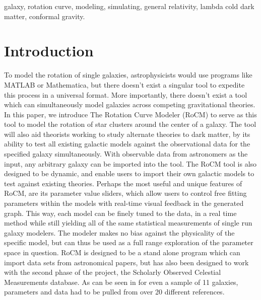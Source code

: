 \documentclass[conference]{IEEEtran-modified}
\begin{document}
	
	\begin{IEEEkeywords}
	\begin{center}
	galaxy, rotation curve, modeling, simulating, general relativity, lambda cold dark matter, conformal gravity.
	\end{center}	
	\end{IEEEkeywords}
	
	
	\IEEEpeerreviewmaketitle
\thispagestyle{plain}
\pagestyle{plain}

\section{Introduction}
To model the rotation of single galaxies, astrophysicists would use programs like MATLAB or Mathematica, but there doesn't exist a singular tool to expedite this process in a universal format.   More importantly, there doesn't exist a tool which can simultaneously model galaxies across competing gravitational theories.  In this paper, we introduce The Rotation Curve Modeler (RoCM) to serve as this tool to model the rotation of star clusters around the center of a galaxy. The tool will also aid theorists working to study alternate theories to dark matter, by its ability to test all existing galactic models against the observational data for the specified galaxy simultaneously. With observable data from astronomers as the input, any arbitrary galaxy can be imported into the tool. The RoCM tool is also designed to be dynamic, and enable users to import their own galactic models to test against existing theories.  Perhaps the most useful and unique features of RoCM, are its parameter value sliders, which allow users to control free fitting parameters within the models with real-time visual feedback in the generated graph. This way, each model can be finely tuned to the data, in a real time method while still yielding all of the same statistical measurements of single run galaxy modelers. The modeler makes no bias against the physicality of the specific model, but can thus be used as a full range exploration of the parameter space in question.  RoCM is designed to be a stand alone program which can import data sets from astronomical papers, but has also been designed to work with the second phase of the project, the Scholarly Observed Celestial Measurements database. As can be seen in \cite{impact} for even a sample of 11 galaxies, parameters and data had to be pulled from over 20 different references.  

\end{document}
